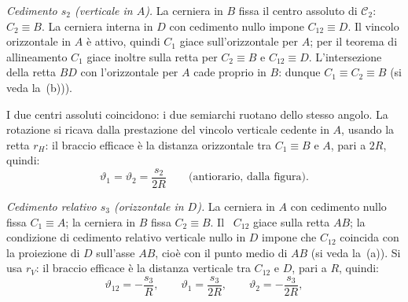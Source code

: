 \begin{esempio}
\begin{svolgimento}
		
		
		



		
		\noindent\textit{Cedimento $s_2$ (verticale in $A$).}
		La cerniera in $B$ fissa il centro assoluto di
		$\mathcal{C}_2$: $C_2 \equiv B$. La cerniera interna in
		$D$ con cedimento nullo impone $C_{12} \equiv D$.
		Il vincolo orizzontale in $A$ è attivo, quindi $C_1$
		giace sull'orizzontale per $A$; per il teorema di
		allineamento $C_1$ giace inoltre sulla retta per
		$C_2 \equiv B$ e $C_{12} \equiv D$. L'intersezione
		della retta $BD$ con l'orizzontale per $A$ cade
		proprio in $B$: dunque $C_1 \equiv C_2 \equiv B$
		(si veda la \,(b))).
		
		I due centri assoluti coincidono: i due semiarchi
		ruotano dello stesso angolo. La rotazione si ricava
		dalla prestazione del vincolo verticale cedente in $A$,
		usando la retta $r_H$: il braccio efficace è la distanza
		orizzontale tra $C_1 \equiv B$ e $A$, pari a $2R$,
		quindi:
		\begin{equation*}
			\vartheta_1 = \vartheta_2 = \frac{s_2}{2R}
			\qquad \text{(antiorario, dalla figura)}.
		\end{equation*}
		
		
		\smallskip
		\noindent\textit{Cedimento relativo $s_3$
			(orizzontale in $D$).}
		La cerniera in $A$ con cedimento nullo fissa
		$C_1 \equiv A$; la cerniera in $B$ fissa $C_2 \equiv B$.
		Il \CRr\ $C_{12}$ giace sulla retta $AB$; la condizione
		di cedimento relativo verticale nullo in $D$ impone che
		$C_{12}$ coincida con la proiezione di $D$ sull'asse
		$AB$, cioè con il punto medio di $AB$
		(si veda la \,(a)). 
		Si usa $r_V$: il braccio efficace è la distanza verticale
		tra $C_{12}$ e $D$, pari a $R$, quindi:
		\begin{equation*}
			\vartheta_{12} = -\frac{s_3}{R}, \qquad
			\vartheta_1 = \frac{s_3}{2R}, \qquad
			\vartheta_2 = -\frac{s_3}{2R},
		\end{equation*}
		

\end{svolgimento}
\end{esempio}

